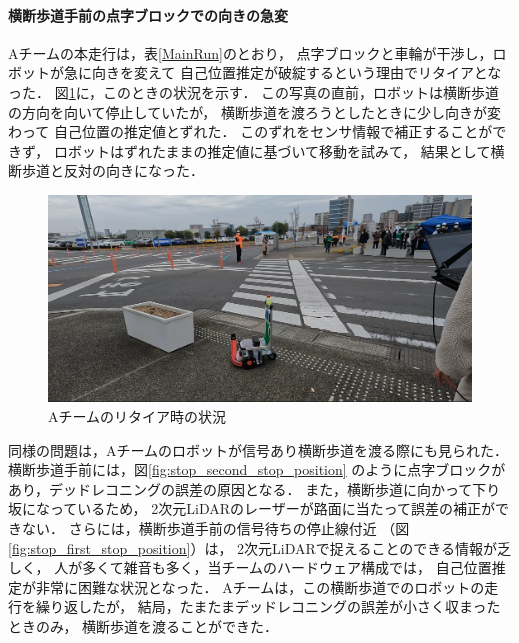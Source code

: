 \documentclass[twocolumn,9pt]{jsproceedings}
\begin{document}
\paragraph{横断歩道手前の点字ブロックでの向きの急変}


Aチームの本走行は，表\ref{MainRun}のとおり，
点字ブロックと車輪が干渉し，ロボットが急に向きを変えて
自己位置推定が破綻するという理由でリタイアとなった．
図\ref{fig:crosswalk_city_hall}に，このときの状況を示す．
この写真の直前，ロボットは横断歩道の方向を向いて停止していたが，
横断歩道を渡ろうとしたときに少し向きが変わって
自己位置の推定値とずれた．
このずれをセンサ情報で補正することができず，
ロボットはずれたままの推定値に基づいて移動を試みて，
結果として横断歩道と反対の向きになった．

\begin{figure}[h]
  \begin{center}
    \includegraphics[width=1.0\linewidth]{figs/crosswalk_city_hall.pdf}
	  \caption{Aチームのリタイア時の状況}
    \label{fig:crosswalk_city_hall}
  \end{center}
\end{figure}

同様の問題は，Aチームのロボットが信号あり横断歩道を渡る際にも見られた．
横断歩道手前には，図\ref{fig:stop_second_stop_position}
のように点字ブロックがあり，デッドレコニングの誤差の原因となる．
また，横断歩道に向かって下り坂になっているため，
2次元LiDARのレーザーが路面に当たって誤差の補正ができない．
さらには，横断歩道手前の信号待ちの停止線付近
（図\ref{fig:stop_first_stop_position}）は，
2次元LiDARで捉えることのできる情報が乏しく，
人が多くて雑音も多く，当チームのハードウェア構成では，
自己位置推定が非常に困難な状況となった．
Aチームは，この横断歩道でのロボットの走行を繰り返したが，
結局，たまたまデッドレコニングの誤差が小さく収まったときのみ，
横断歩道を渡ることができた．
\end{document}
